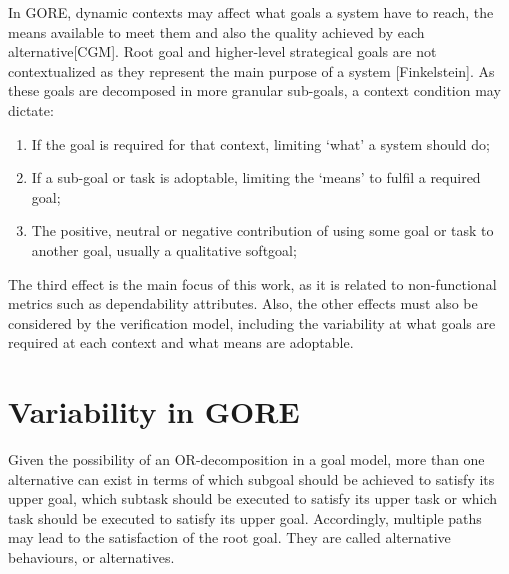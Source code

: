 
In GORE, dynamic contexts may affect what goals a system have to reach, the means available to meet them and also the quality achieved by each alternative[CGM]. Root goal and higher-level strategical goals are not contextualized as they represent the main purpose of a system [Finkelstein]. As these goals are decomposed in more granular sub-goals, a context condition may dictate:

\begin{enumerate}

\item If the goal is required for that context, limiting `what' a system should do;
\medskip

\item If a sub-goal or task is adoptable, limiting the `means' to fulfil a required goal;
\medskip

\item The positive, neutral or negative contribution of using some goal or task to another goal, usually a qualitative softgoal;

\end{enumerate}

The third effect is the main focus of this work, as it is related to non-functional metrics such as dependability attributes. Also, the other effects must also be considered by the verification model, including the variability at what goals are required at each context and what means are adoptable.


\section{Variability in GORE}\label{sec:variability}

Given the possibility of an OR-decomposition in a goal model, more than one alternative can exist in terms of which subgoal should be achieved to satisfy its upper goal,  which subtask should be executed to satisfy its upper task or which task should be executed to satisfy its upper goal. Accordingly, multiple paths may lead to the satisfaction of the root goal. They are called alternative behaviours, or alternatives. 

